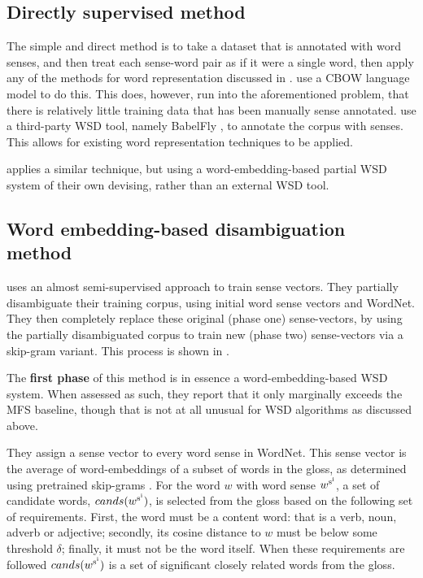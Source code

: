\documentclass[12pt,parskip]{komatufte}
\begin{document}
\subsection{Directly supervised method}
The simple and direct method is to take a dataset that is annotated with word senses,
and then treat each sense-word pair as if it were a single word, then apply any of the methods for word representation discussed in .
 use a CBOW language model \parencite{mikolov2013efficient} to do this.
This does, however, run into the aforementioned problem, that there is relatively little training data that has been manually sense annotated.
\textcite{iacobacci2015sensembed} use a third-party WSD tool, namely BabelFly \parencite{Moro2014}, to annotate the corpus with senses.
This allows for existing word representation techniques to be applied.


 applies a similar technique, but using a word-embedding-based partial WSD system of their own devising, rather than an external WSD tool.


\subsection{Word embedding-based disambiguation method}\label{sec:pseudo-semi-supervised-method}



\textcite{Chen2014} uses an almost semi-supervised approach to train sense vectors.
They partially disambiguate their training corpus, using initial word sense vectors and WordNet.
They then completely replace these original (phase one) sense-vectors, by using the partially disambiguated corpus to train new (phase two) sense-vectors via a skip-gram variant.
This process is shown in .


The \textbf{first phase} of this method is in essence a word-embedding-based WSD system.
When assessed as such, they report that it only marginally exceeds the MFS baseline,
though that is not at all unusual for WSD algorithms as discussed above.

They assign a sense vector to every word sense in WordNet.
This sense vector is the average of word-embeddings of a subset of words in the gloss,
as determined using pretrained skip-grams \parencite{mikolov2013efficient}.
For the word $w$ with word sense $\d w_{\n s_i}$,
a set of candidate words, $cands(\d w_{\n s_i})$, is selected from the gloss 
based on the following set of requirements.
First, the word must be a content word: that is a verb, noun, adverb or adjective;
secondly, its cosine distance to $w$ must be below some threshold $\delta$;
finally, it must not be the word itself.
When these requirements are followed $cands(\d w_{\n s_i})$ is a set of significant closely related words from the gloss.
\end{document}

